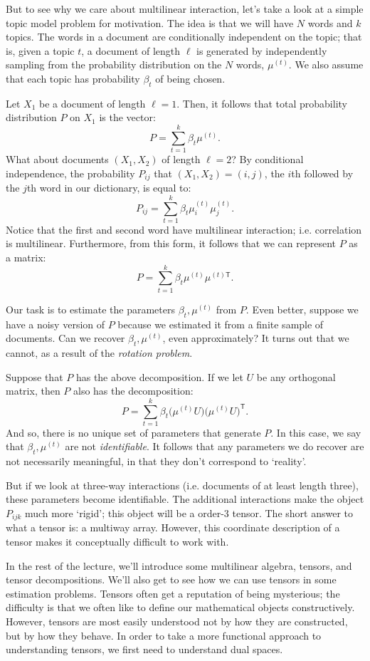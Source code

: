 But to see why we care about multilinear interaction, let's take a look at a simple topic model problem for motivation. The idea is that we will have $N$ words and $k$ topics. The words in a document are conditionally independent on the topic; that is, given a topic $t$, a document of length $\ell$ is generated by independently sampling from the probability distribution on the $N$ words, $\mu^{(t)}$. We also assume that each topic has probability  $\beta_t$ of being chosen.

Let $X_1$ be a document of length $\ell = 1$. Then, it follows that total probability distribution $P$ on $X_1$ is the vector:
\[P = \sum_{t=1}^k \beta_t \mu^{(t)}. \]
What about documents $(X_1, X_2)$ of length $\ell = 2$? By conditional independence, the probability $P_{ij}$ that $(X_1,X_2) = (i,j)$, the $i$th followed by the $j$th word in our dictionary, is equal to:
\[P_{ij} = \sum_{t=1}^k \beta_t \mu^{(t)}_i \mu^{(t)}_j.\]
Notice that the first and second word have multilinear interaction; i.e. correlation is multilinear. Furthermore, from this form, it follows that we can represent $P$ as a matrix:
\[P = \sum_{t=1}^k\beta_t \mu^{(t)} \mu^{(t)\mathsf{T}}.\]

Our task is to estimate the parameters $\beta_t, \mu^{(t)}$ from $P$. Even better, suppose we have a noisy version of $P$ because we estimated it from a finite sample of documents. Can we recover $\beta_t, \mu^{(t)}$, even approximately? It turns out that we cannot, as a result of the \emph{rotation problem}.

Suppose that $P$ has the above decomposition. If we let $U$ be any orthogonal matrix, then $P$ also has the decomposition:
\[P = \sum_{t=1}^k \beta_t \big(\mu^{(t)} U\big)\big(\mu^{(t)} U\big)^\mathsf{T}.\]
And so, there is no unique set of parameters that generate $P$. In this case, we say that $\beta_t, \mu^{(t)}$ are not \emph{identifiable}. It follows that any parameters we do recover are not necessarily meaningful, in that they don't correspond to `reality'.

But if we look at three-way interactions (i.e. documents of at least length three), these parameters become identifiable. The additional interactions make the object $P_{ijk}$ much more `rigid'; this object will be a order-3 tensor. The short answer to what a tensor is: a multiway array. However, this coordinate description of a tensor makes it conceptually difficult to work with.



In the rest of the lecture, we'll introduce some multilinear algebra, tensors, and tensor decompositions. We'll also get to see how we can use tensors in some estimation problems. Tensors often get a reputation of being mysterious; the difficulty is that we often like to define our mathematical objects constructively. However, tensors are most easily understood not by how they are constructed, but by how they behave. In order to take a more functional approach to understanding tensors, we first need to understand dual spaces.

